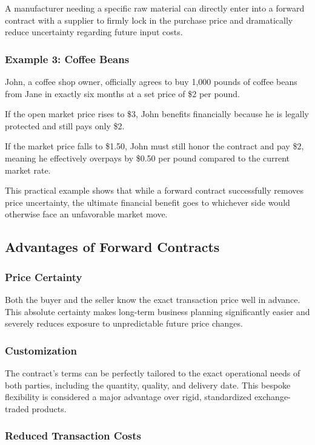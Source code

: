 \documentclass[12pt,openany]{book}
\begin{document}
A manufacturer needing a specific raw material can directly enter into a forward contract with a supplier to firmly lock in the purchase price and dramatically reduce uncertainty regarding future input costs.

\subsubsection{Example 3: Coffee Beans}

John, a coffee shop owner, officially agrees to buy 1,000 pounds of coffee beans from Jane in exactly six months at a set price of \$2 per pound.

If the open market price rises to \$3, John benefits financially because he is legally protected and still pays only \$2.

If the market price falls to \$1.50, John must still honor the contract and pay \$2, meaning he effectively overpays by \$0.50 per pound compared to the current market rate.

This practical example shows that while a forward contract successfully removes price uncertainty, the ultimate financial benefit goes to whichever side would otherwise face an unfavorable market move.

\subsection{Advantages of Forward Contracts}

\subsubsection{Price Certainty}

Both the buyer and the seller know the exact transaction price well in advance. This absolute certainty makes long-term business planning significantly easier and severely reduces exposure to unpredictable future price changes.

\subsubsection{Customization}

The contract's terms can be perfectly tailored to the exact operational needs of both parties, including the quantity, quality, and delivery date. This bespoke flexibility is considered a major advantage over rigid, standardized exchange-traded products.

\subsubsection{Reduced Transaction Costs}
\end{document}
